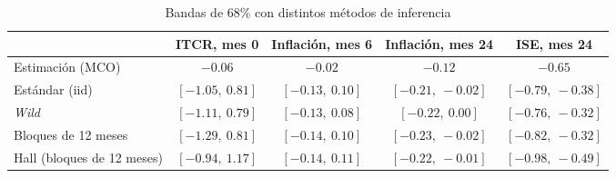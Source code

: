 \begin{table}[H]
\centering
\caption{Bandas de 68\% con distintos métodos de inferencia}
\label{tab:D_otros_metodos}
\small
\begin{tabular}{@{}lcccc@{}}
\toprule
 & ITCR, mes 0 & Inflación, mes 6 & Inflación, mes 24 & ISE, mes 24 \\
\midrule
Estimación (MCO) & $-0.06$ & $-0.02$ & $-0.12$ & $-0.65$ \\
Estándar (iid) & $[-1.05,\ 0.81]$ & $[-0.13,\ 0.10]$ & $[-0.21,\ -0.02]$ & $[-0.79,\ -0.38]$ \\
\textit{Wild} & $[-1.11,\ 0.79]$ & $[-0.13,\ 0.08]$ & $[-0.22,\ 0.00]$ & $[-0.76,\ -0.32]$ \\
Bloques de 12 meses & $[-1.29,\ 0.81]$ & $[-0.14,\ 0.10]$ & $[-0.23,\ -0.02]$ & $[-0.82,\ -0.32]$ \\
Hall (bloques de 12 meses) & $[-0.94,\ 1.17]$ & $[-0.14,\ 0.11]$ & $[-0.22,\ -0.01]$ & $[-0.98,\ -0.49]$ \\
\bottomrule
\end{tabular}
\end{table}

